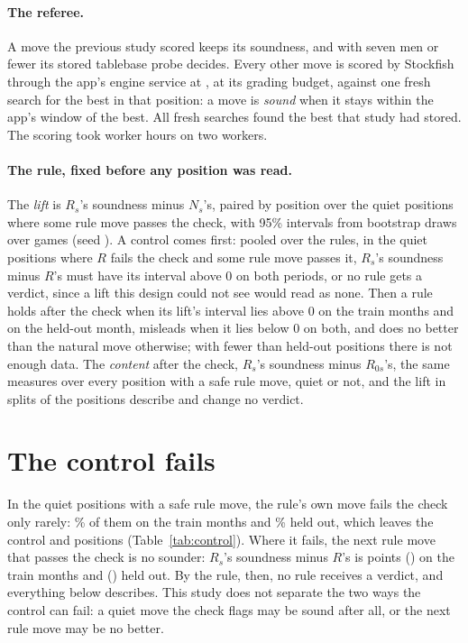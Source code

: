 \documentclass[11pt]{article}
\begin{document}
\paragraph{The referee.} A move the previous study scored keeps its soundness, and with seven men or
fewer its stored tablebase probe decides. Every other move is scored by Stockfish through the app's
engine service at \texttt{\ScoreCommit}, at its grading budget, against one fresh search for the best
in that position: a move is \emph{sound} when it stays within the app's window of the best. All
\FreshSearches{} fresh searches found the best that study had stored. The scoring took
\WorkerHours{} worker hours on two workers.

\paragraph{The rule, fixed before any position was read.} The \emph{lift} is $R_s$'s soundness
minus $N_s$'s, paired by position over the quiet positions where some rule move passes the check,
with 95\% intervals from \Draws{} bootstrap draws over games (seed \Seed). A control comes first:
pooled over the rules, in the quiet positions where $R$ fails the check and some rule move passes
it, $R_s$'s soundness minus $R$'s must have its interval above 0 on both periods, or no rule gets a
verdict, since a lift this design could not see would read as none. Then a rule holds after the check
when its lift's interval lies above 0 on the train months and on the held-out month, misleads when it
lies below 0 on both, and does no better than the natural move otherwise; with fewer than
\MinHeld{} held-out positions there is not enough data. The \emph{content} after the check,
$R_s$'s soundness minus $R_{0s}$'s, the same measures over every position with a safe rule move,
quiet or not, and the lift in splits of the positions describe and change no verdict.

\section{The control fails}

In the quiet positions with a safe rule move, the rule's own move fails the check only rarely:
\ControlShareTrain\% of them on the train months and \ControlShareHeld\% held out, which leaves the
control \ControlTrainN{} and \ControlHeldN{} positions (Table~\ref{tab:control}). Where it fails, the
next rule move that passes the check is no sounder: $R_s$'s soundness minus $R$'s is
\ControlTrain{} points (\ControlTrainCi) on the train months and \ControlHeld{} (\ControlHeldCi)
held out. By the rule, then, no rule receives a verdict, and everything below describes. This study
does not separate the two ways the control can fail: a quiet move the check flags may be sound after
all, or the next rule move may be no better.
\end{document}
